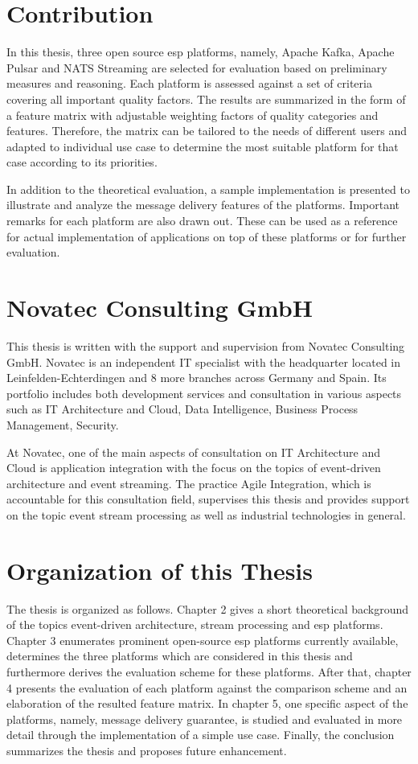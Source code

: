 \section{Contribution}
In this thesis, three open source \acrshort{esp} platforms, namely, Apache Kafka, Apache Pulsar and NATS Streaming are selected for evaluation based on preliminary measures and reasoning. Each platform is assessed against a set of criteria covering all important quality factors. The results are summarized in the form of a feature matrix with adjustable weighting factors of quality categories and features. Therefore, the matrix can be tailored to the needs of different users and adapted to individual use case to determine the most suitable platform for that case according to its priorities.

In addition to the theoretical evaluation, a sample implementation is presented to illustrate and analyze the message delivery features of the platforms. Important remarks for each platform are also drawn out. These can be used as a reference for actual implementation of applications on top of these platforms or for further evaluation.
\section{Novatec Consulting GmbH}
This thesis is written with the support and supervision from Novatec Consulting GmbH. Novatec is an independent IT specialist with the headquarter located in Leinfelden-Echterdingen and 8 more branches across Germany and Spain. Its portfolio includes both development services and consultation in various aspects such as IT Architecture and Cloud, Data Intelligence, Business Process Management, Security.

At Novatec, one of the main aspects of consultation on IT Architecture and Cloud is application integration with the focus on the topics of event-driven architecture and event streaming. The practice Agile Integration, which is accountable for this consultation field, supervises this thesis and provides support on the topic event stream processing as well as industrial technologies in general. 

\section{Organization of this Thesis}
The thesis is organized as follows. Chapter 2 gives a short theoretical background of the topics event-driven architecture, stream processing and \acrshort{esp} platforms. Chapter 3 enumerates prominent open-source \acrshort{esp} platforms currently available, determines the three platforms which are considered in this thesis and furthermore derives the evaluation scheme for these platforms. After that, chapter 4 presents the evaluation of each platform against the comparison scheme and an elaboration of the resulted feature matrix. In chapter 5, one specific aspect of the platforms, namely, message delivery guarantee, is studied and evaluated in more detail through the implementation of a simple use case. Finally, the conclusion summarizes the thesis and proposes future enhancement.

